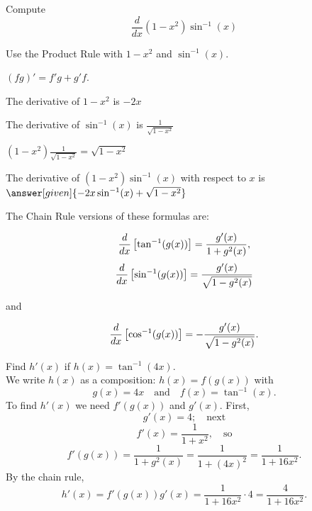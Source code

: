 \documentclass{ximera}
\begin{document}
\begin{problem} %
  Compute
  \[
  \frac{d}{dx} (1-x^2) \sin^{-1}(x)
  \]
  
    \begin{hint}
      Use the Product Rule with $1-x^2$ and $\sin^{-1}(x)$.
    \end{hint}
    \begin{hint}
      $(fg)' = f'g+g'f$.
    \end{hint}
    \begin{hint}
      The derivative of $1 - x^2$ is $-2x$
    \end{hint}
    \begin{hint}
      The derivative of $\sin^{-1}(x)$ is $\frac{1}{\sqrt{1-x^2}}$
    \end{hint}
		\begin{hint}
       $(1-x^2) \frac{1}{\sqrt{1-x^2}} = \sqrt{1-x^2}$
    \end{hint}
		The derivative of $(1-x^2)\sin^{-1}(x)$ with respect to $x$ is
		 $\answer[given]{-2x \sin^{-1}(x) + \sqrt{1-x^2}}$
		
\end{problem}


The Chain Rule versions of these formulas are:


\[
 \frac{d}{\mathop{}\!d x} \left[\tan^{-1}(g(x))\right] = \frac{g'(x)}{1 + g^2(x)},
\]
\[
 \frac{d}{\mathop{}\!d x} \left[\sin^{-1}(g(x))\right] = \frac{g'(x)}{\sqrt{1 - g^2(x)}}
\]

and

\[
 \frac{d}{\mathop{}\!d x} \left[\cos^{-1}(g(x))\right] = -\frac{g'(x)}{\sqrt{1 - g^2(x)}}.
\]


\begin{example} %
Find $h'(x)$ if $h(x) = \tan^{-1}(4x)$.\\
We write $h(x)$ as a composition: $h(x)=f(g(x))$ with 
\[g(x) = 4x  \quad \text{and} \quad  f(x) = \tan^{-1}(x).\]
 To find $h'(x)$ we need $f'(g(x))$ and $g'(x)$.  First, 
\[g'(x) = 4; \quad \text{next} \] 
\[f'(x) = \frac{1}{1+x^2} , \quad \text{so}\]
\[ f'(g(x)) = \frac{1}{1+g^2(x)} =\frac{1}{1+(4x)^2}=\frac{1}{1+16x^2}.\]
By the chain rule,
\[h'(x) = f'(g(x))g'(x) = \frac{1}{1+16x^2} \cdot 4 = \frac{4}{1+16x^2}.\]
\end{example}

\begin{center}
\begin{foldable}
\end{foldable}
\end{center}
\end{document}
